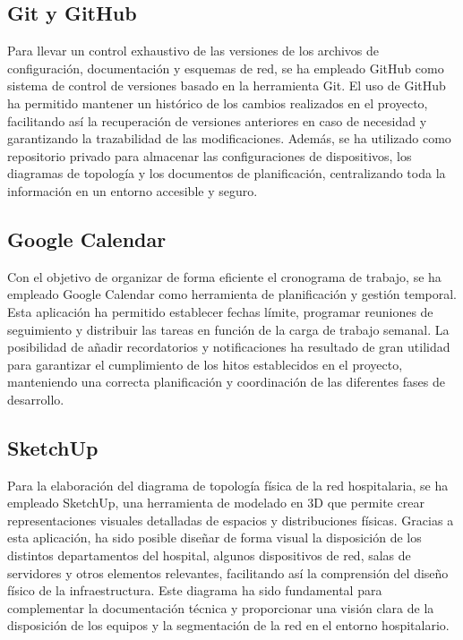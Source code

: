 \subsection{Git y GitHub}
Para llevar un control exhaustivo de las versiones de los archivos de configuración, documentación y esquemas de red, se ha empleado GitHub como sistema de control de 
versiones basado en la herramienta Git.
El uso de GitHub ha permitido mantener un histórico de los cambios realizados en el proyecto, facilitando así la recuperación de versiones anteriores en caso de necesidad 
y garantizando la trazabilidad de las modificaciones. Además, se ha utilizado como repositorio privado para almacenar las configuraciones de dispositivos, los diagramas de 
topología y los documentos de planificación, centralizando toda la información en un entorno accesible y seguro.

\subsection{Google Calendar}
Con el objetivo de organizar de forma eficiente el cronograma de trabajo, se ha empleado Google Calendar como herramienta de planificación y gestión temporal. Esta 
aplicación ha permitido establecer fechas límite, programar reuniones de seguimiento y distribuir las tareas en función de la carga de trabajo semanal. La posibilidad 
de añadir recordatorios y notificaciones ha resultado de gran utilidad para garantizar el cumplimiento de los hitos establecidos en el proyecto, manteniendo una correcta 
planificación y coordinación de las diferentes fases de desarrollo.

\subsection{SketchUp}
Para la elaboración del diagrama de topología física de la red hospitalaria, se ha empleado SketchUp, una herramienta de modelado en 3D que permite crear representaciones 
visuales detalladas de espacios y distribuciones físicas.
Gracias a esta aplicación, ha sido posible diseñar de forma visual la disposición de los distintos departamentos del hospital, algunos dispositivos de red, salas de servidores
y otros elementos relevantes, facilitando así la comprensión del diseño físico de la infraestructura. Este diagrama ha sido fundamental para complementar la documentación técnica y 
proporcionar una visión clara de la disposición de los equipos y la segmentación de la red en el entorno hospitalario.